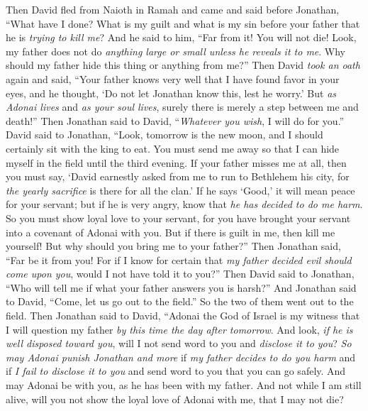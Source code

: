 \begin{biblechapter} %
 Then David fled from Naioth in Ramah and came and said before Jonathan, “What have I done? What is my guilt and what is my sin before your father that he is \textit{trying to kill me}?
\verse And he said to him, “Far from it! You will not die! Look, my father does not do \textit{anything large or small unless he reveals it to me}. Why should my father hide this thing or anything from me?”
\verse Then David \textit{took an oath} again and said, “Your father knows very well that I have found favor in your eyes, and he thought, ‘Do not let Jonathan know this, lest he worry.’ But \textit{as Adonai lives} and \textit{as your soul lives}, surely there is merely a step between me and death!”
\verse Then Jonathan said to David, “\textit{Whatever you wish}, I will do for you.”
\verse David said to Jonathan, “Look, tomorrow is the new moon, and I should certainly sit with the king to eat. You must send me away so that I can hide myself in the field until the third evening.
\verse If your father misses me at all, then you must say, ‘David earnestly asked from me to run to Bethlehem his city, for \textit{the yearly sacrifice} is there for all the clan.’
\verse If he says ‘Good,’ it will mean peace for your servant; but if he is very angry, know that \textit{he has decided to do me harm}.
\verse So you must show loyal love to your servant, for you have brought your servant into a covenant of Adonai with you. But if there is guilt in me, then kill me yourself! But why should you bring me to your father?”
\verse Then Jonathan said, “Far be it from you! For if I know for certain that \textit{my father decided evil should come upon you}, would I not have told it to you?”
\verse Then David said to Jonathan, “Who will tell me if what your father answers you is harsh?”
\verse And Jonathan said to David, “Come, let us go out to the field.” So the two of them went out to the field.
\verse Then Jonathan said to David, “Adonai the God of Israel is my witness that I will question my father \textit{by this time the day after tomorrow}. And look, \textit{if he is well disposed toward you}, will I not send word to you and \textit{disclose it to you}?
\verse \textit{So may Adonai punish Jonathan and more} if \textit{my father decides to do you harm} and if \textit{I fail to disclose it to you} and send word to you that you can go safely. And may Adonai be with you, as he has been with my father.
\verse And not while I am still alive, will you not show the loyal love of Adonai with me, that I may not die?

\end{biblechapter}
